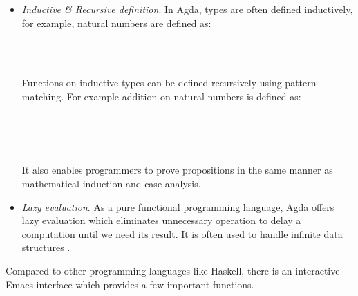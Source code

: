 \begin{itemize}
\item \textit{Inductive \& Recursive definition}. In Agda, types are often defined inductively, for example, natural numbers are defined as:

\begin{code}\>\<%
\>  \AgdaSymbol{:}  \<%
\\
\>[0]\<[2]%
\>[2] \AgdaSymbol{:} \<%
\\
\>[0]\<[2]%
\>[2] \<[7]%
\>[7]\AgdaSymbol{:} \AgdaSymbol{(} \AgdaSymbol{:} \AgdaSymbol{)}  \<%
\>\<\end{code}

Functions on inductive types can be defined recursively using pattern matching. For example addition on natural numbers is defined as:

\begin{code}\>\<%
\\
\>\AgdaFunction{\_+\_} \AgdaSymbol{:}     \<%
\\
\> \<[6]%
\>[6]\AgdaFunction{+}  \AgdaSymbol{=} \<%
\\
\>  \AgdaFunction{+}  \AgdaSymbol{=}  \AgdaSymbol{(} \AgdaFunction{+} \AgdaSymbol{)}\<%
\>\<\end{code}

It also enables programmers to prove propositions in the same manner as mathematical induction and case analysis.

\item \textit{Lazy evaluation}. As a pure functional programming language, Agda offers lazy evaluation which eliminates unnecessary operation to delay a computation until we need its result. It is often used to handle infinite data structures \cite{wiki:Lazy_evaluation}.

\end{itemize}

Compared to other programming languages like Haskell, there is an interactive Emacs interface which provides a few important functions.

